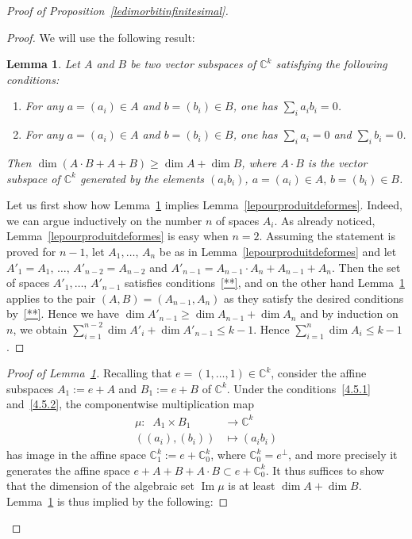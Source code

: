 \documentclass[11pt]{article}
\newtheorem{lemm}[theo]{Lemma}
\theoremstyle{definition}
\numberwithin{equation}{section}
\numberwithin{figure}{section}
\numberwithin{table}{section}
\DeclareMathOperator{\im}{Im}
\begin{document}
\begin{proof}[Proof of Proposition~\ref{ledimorbitinfinitesimal}]
\begin{proof}
We will use the following result:

\begin{lemm}\label{ledeuxA}
Let $A$ and $B$ be two vector subspaces
of $\mathbb{C}^k$ satisfying the following conditions:
\begin{enumerate}
\item \label{4.5.1} For any $a=(a_i)\in A$ and $b=(b_i)\in B$, one has $\sum_ia_ib_i=0$.
\item \label{4.5.2} For any $a=(a_i)\in A$ and $b=(b_i)\in B$, one has $\sum_ia_i=0$ and $\sum_ib_i=0$.
\end{enumerate}
Then $\dim (A\cdot B +A+B)\geq \dim A+\dim B$, where $A\cdot B$ is the vector subspace of $\mathbb{C}^k$ generated by the elements $(a_ib_i)$, $a=(a_i)\in A,\,b=(b_i)\in B$.
\end{lemm}

Let us first show how Lemma~\ref{ledeuxA} implies Lemma~\ref{lepourproduitdeformes}. Indeed, we can argue inductively on the number $n$ of spaces $A_i$. As already noticed, Lemma~\ref{lepourproduitdeformes} is easy when $n=2$. Assuming the statement is proved for $n-1$, let $A_1,\dots,\,A_n$ be as in Lemma~\ref{lepourproduitdeformes} and let $A'_1=A_1,\,\dots,\,A'_{n-2}=A_{n-2}$ and $A'_{n-1}=A_{n-1}\cdot A_n+A_{n-1}+A_n$. Then the set of spaces $A'_1,\dots,\,A'_{n-1}$ satisfies conditions~\eqref{**}, and on the other hand Lemma~\ref{ledeuxA} applies to the pair $(A,B)=(A_{n-1},A_n)$ as they satisfy the desired conditions by~\eqref{**}. Hence we have $\dim A'_{n-1}\geq \dim A_{n-1}+ \dim A_{n}$ and by induction on $n$, we obtain $\sum_{i=1}^{n-2}\dim A'_{i}+\dim A'_{n-1}\leq k-1$. Hence $\sum_{i=1}^{n}\dim A_{i}\leq k-1$.
\end{proof}

\begin{proof}[Proof of Lemma~\ref{ledeuxA}]
Recalling that $e=(1,\dots,1)\in \mathbb{C}^k$,
consider the affine subspaces $A_1:= e+A$ and $B_1:=e+B$ of $ \mathbb{C}^k$. Under the conditions~\eqref{4.5.1} and~\eqref{4.5.2}, the componentwise multiplication map
\begin{align*}
\mu:\;\; A_1\times B_1&\rightarrow \mathbb{C}^k\\
((a_i),(b_i))&\mapsto(a_ib_i)
\end{align*}
has image in the affine space $\mathbb{C}^k_1:=e+\mathbb{C}^k_0$, where $\mathbb{C}^k_0=e^{\perp}$, and more precisely it generates the affine space $e+A+B+A\cdot B\subset e+\mathbb{C}^k_0$. It thus suffices to show that the dimension of the algebraic set $\im \mu$ is at least $\dim A+\dim B$. Lemma~\ref{ledeuxA} is thus implied by the following:


\end{proof}
\end{proof}
\end{document}
